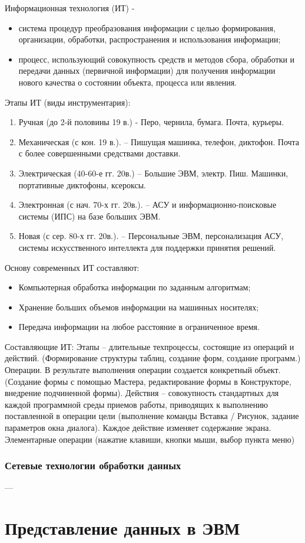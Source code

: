 \documentclass[a4paper]{article}
\begin{document}
  Информационная технология (ИТ) -
  \begin{itemize}
      \item система процедур преобразования информации с целью формирования, организации, обработки, распространения и использования информации;
      \item процесс, использующий совокупность средств и методов сбора, обработки и передачи данных (первичной информации) для получения информации нового качества о состоянии объекта, процесса или явления.
\end{itemize}
Этапы ИТ (виды инструментария):
\begin{enumerate}
  \item Ручная  (до 2-й половины 19 в.) - Перо, чернила, бумага. Почта, курьеры.
  \item Механическая (с кон. 19 в.). – Пишущая машинка, телефон, диктофон. Почта с более совершенными средствами доставки.
  \item Электрическая (40-60-е гг. 20в.) – Большие ЭВМ, электр. Пиш. Машинки, портативные диктофоны, ксероксы.
  \item  Электронная (с нач. 70-х гг. 20в.). – АСУ и информационно-поисковые системы (ИПС) на базе больших ЭВМ.
  \item Новая (с сер. 80-х гг. 20в.).  – Персональные ЭВМ, персонализация АСУ, системы искусственного интеллекта для поддержки принятия решений.
\end{enumerate}

Основу современных ИТ составляют:
\begin{itemize}
  \item Компьютерная обработка информации по заданным алгоритмам;
  \item Хранение больших объемов информации на машинных носителях;
  \item Передача информации на любое расстояние в ограниченное время.
\end{itemize}

Составляющие ИТ:
Этапы – длительные техпроцессы, состоящие из операций и действий. (Формирование структуры таблиц, создание форм, создание программ.)
Операции. В результате выполнения операции создается конкретный объект. (Создание формы с помощью Мастера, редактирование формы в Конструкторе, внедрение подчиненной формы).
Действия – совокупность стандартных для каждой программной среды приемов работы, приводящих к выполнению поставленной в операции цели (выполнение команды Вставка / Рисунок, задание параметров окна диалога). Каждое действие изменяет содержание экрана.
Элементарные операции (нажатие клавиши, кнопки мыши, выбор пункта меню)

\subsubsection{Сетевые технологии обработки данных}

---

\section{Представление данных в ЭВМ}
\end{document}
